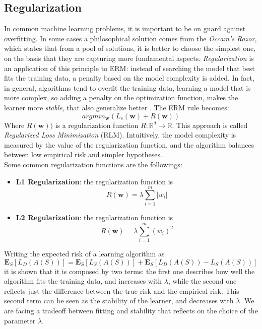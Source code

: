 \subsection{Regularization}
In common machine learning problems, it is important to be on guard against overfitting. In some cases a philosophical solution comes from the \textit{Occam's Razor}, which states that from a pool of solutions, it is better to choose the simplest one, on the basis that they are capturing more fundamental aspects. \textit{Regularization} is an application of this principle to ERM: instead of searching the model that best fits the training data, a penalty based on the model complexity is added. In fact, in general, algorithms tend to overfit the training data, learning a model that is more complex, so adding a penalty on the optimization function, makes the learner more \textit{stable}, that also generalize better \cite{stability_generalization}.
The ERM rule becomes:
\[argmin_\mathbf{w} (L_s(\mathbf{w}) + R(\mathbf{w}))\]
Where $R(\mathbf{w}))$ is a regularization function $R: \mathbb{R}^d \rightarrow \mathbb{R} $. This approach is called \textit{Regularized Loss Minimization} (RLM). Intuitively, the model complexity is measured by the value of the regularization function, and the algorithm balances between low empirical risk and simpler hypotheses.\\
Some common regularization functions are the followings:
\begin{itemize}
	\item \textbf{L1 Regularization}: the regularization function is
	\[ R(\textbf{w}) = \lambda \sum_{i=1}^{m} |w_i| \]
	\item \textbf{L2 Regularization}: the regularization function is
	\[ R(\textbf{w}) = \lambda \sum_{i=1}^{m} (w_i)^2 \]
\end{itemize}

Writing the expected risk of a learning algorithm as
\[ \mathbf{E}_S[L_D(A(S))] = \mathbf{E}_S[L_S(A(S))] + \mathbf{E}_S[L_D(A(S)) - L_S(A(S))] \]
it is shown that it is composed by two terms: the first one describes how well the algorithm fits the training data, and increases with $\lambda$, while the second one reflects just the difference between the true risk and the empirical risk. This second term can be seen as the stability of the learner, and decreases with $\lambda$. We are facing a tradeoff between fitting and stability that reflects on the choice of the parameter $\lambda$. 



